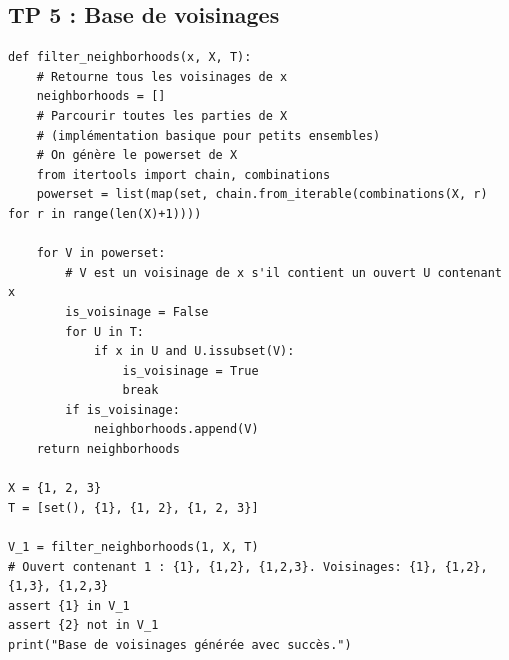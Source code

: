 \documentclass[11pt,a4paper]{article}
\begin{document}
\subsection*{TP 5 : Base de voisinages}
\begin{lstlisting}
def filter_neighborhoods(x, X, T):
    # Retourne tous les voisinages de x
    neighborhoods = []
    # Parcourir toutes les parties de X
    # (implémentation basique pour petits ensembles)
    # On génère le powerset de X
    from itertools import chain, combinations
    powerset = list(map(set, chain.from_iterable(combinations(X, r) for r in range(len(X)+1))))

    for V in powerset:
        # V est un voisinage de x s'il contient un ouvert U contenant x
        is_voisinage = False
        for U in T:
            if x in U and U.issubset(V):
                is_voisinage = True
                break
        if is_voisinage:
            neighborhoods.append(V)
    return neighborhoods

X = {1, 2, 3}
T = [set(), {1}, {1, 2}, {1, 2, 3}]

V_1 = filter_neighborhoods(1, X, T)
# Ouvert contenant 1 : {1}, {1,2}, {1,2,3}. Voisinages: {1}, {1,2}, {1,3}, {1,2,3}
assert {1} in V_1
assert {2} not in V_1
print("Base de voisinages générée avec succès.")
\end{lstlisting}
\end{document}
